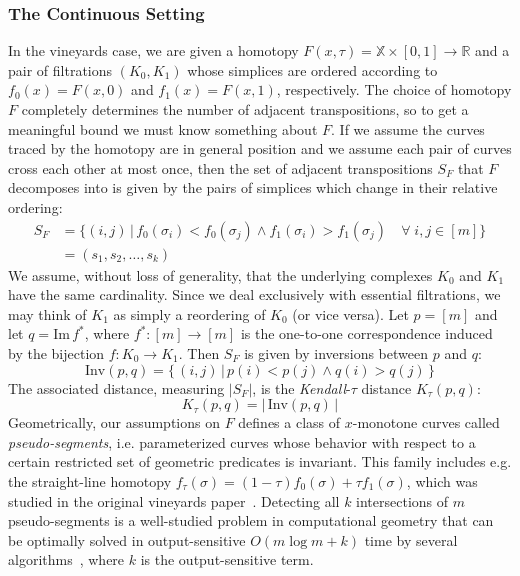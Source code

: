 \documentclass{siamart190516}
\begin{document}
\subsubsection{The Continuous Setting}\label{sec:continuous_setting}
In the vineyards case, we are given a homotopy $F(x, \tau) = \mathbb{X} \times [0,1] \to \mathbb{R}$ and a pair of filtrations $(K_0, K_1)$ whose simplices are ordered according to $f_0(x) = F(x, 0)$ and $f_1(x) = F(x, 1)$, respectively. The choice of homotopy $F$ completely determines the number of adjacent transpositions, so to get a meaningful bound we must know something about $F$. If we assume the curves traced by the homotopy are in general position and we assume each pair of curves cross each other at most once, then the set of adjacent transpositions $S_F$ that $F$ decomposes into is given by the pairs of simplices which change in their relative ordering:
\begin{align}\label{eq:sf_schedule}
	S_F &= \{ (i,j) \, | \, f_0(\sigma_i) < f_0(\sigma_j) \land  f_1(\sigma_i) > f_1(\sigma_j) \quad \forall \; i,j \in [m] \} \\
	&= ( s_1, s_2, \dots, s_k )
\end{align}
We assume, without loss of generality, that the underlying complexes $K_0$ and $K_1$ have the same cardinality. 
Since we deal exclusively with essential filtrations, we may think of $K_1$ as simply a reordering of $K_0$ (or vice versa). Let $p = [m]$ and let $q = \mathrm{Im}\,f^\ast$, where $f^\ast : [m] \to [m]$ is the one-to-one correspondence induced by the bijection $f: K_0 \to K_1$. Then $S_F$ is given by inversions between $p$ and $q$:
$$ \mathrm{Inv}(p, q) = \{ \, (i,j) \, | \, p(i) < p(j) \land q(i) > q(j)  \, \}$$
The associated distance, measuring $\lvert S_F \rvert$, is the \emph{Kendall}-$\tau$ distance $K_\tau(p,q)$: 
\begin{equation}\label{eq:kendall_dist}
	K_\tau(p, q) = \lvert \, \mathrm{Inv}(p, q) \, \rvert
\end{equation}
Geometrically, our assumptions on $F$ defines a class of $x$-monotone curves called \emph{pseudo-segments}, i.e. parameterized curves whose behavior with respect to a certain restricted set of geometric predicates is invariant. This family includes e.g. the straight-line homotopy $f_\tau(\sigma) = (1 - \tau) f_0(\sigma) + \tau f_1(\sigma)$, which was studied in the original vineyards paper~\cite{cohen2006vines}. Detecting all $k$ intersections of $m$ pseudo-segments is a well-studied problem in computational geometry that can be optimally solved in output-sensitive $O(m \log m + k)$ time by several algorithms~\cite{boissonnat2000efficient}, where $k$ is the output-sensitive term. 
\end{document}
